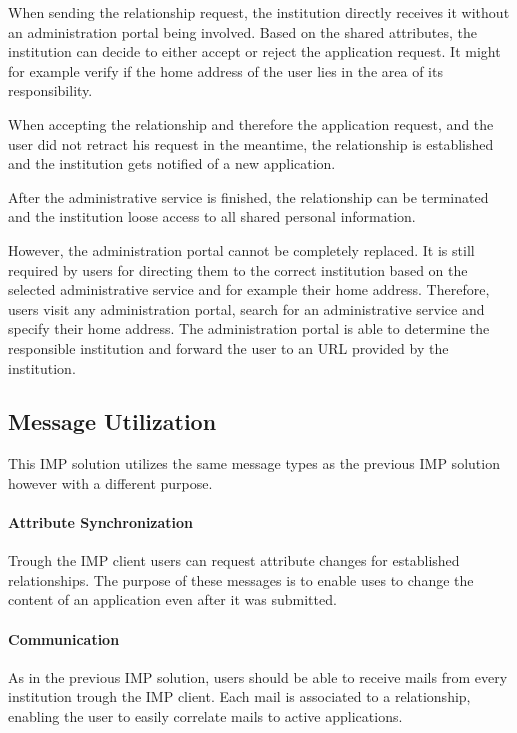 When sending the relationship request, the institution directly receives it without an administration portal being involved. Based on the shared attributes, the institution can decide to either accept or reject the application request. It might for example verify if the home address of the user lies in the area of its responsibility.

When accepting the relationship and therefore the application request, and the user did not retract his request in the meantime, the relationship is established and the institution gets notified of a new application.

After the administrative service is finished, the relationship can be terminated and the institution loose access to all shared personal information.

However, the administration portal cannot be completely replaced. It is still required by users for directing them to the correct institution based on the selected administrative service and for example their home address. Therefore, users visit any administration portal, search for an administrative service and specify their home address. The administration portal is able to determine the responsible institution and forward the user to an URL provided by the institution. 

\subsection{Message Utilization}

This IMP solution utilizes the same message types as the previous IMP solution however with a different purpose.

\paragraph{Attribute Synchronization}

Trough the IMP client users can request attribute changes for established relationships. The purpose of these messages is to enable uses to change the content of an application even after it was submitted.

\paragraph{Communication}

As in the previous IMP solution, users should be able to receive mails from every institution trough the IMP client. Each mail is associated to a relationship, enabling the user to easily correlate mails to active applications.

